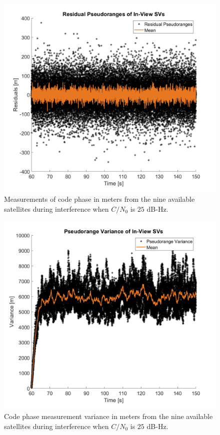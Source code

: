 \documentclass[12pt]{report}
\begin{document}
\begin{figure}[!ht]
  \centering
  \includegraphics[width=0.75\linewidth]{Figures/Results/Scenario1/Case25/codephase.png}
  \caption{Measurements of code phase in meters from the nine available satellites during interference when \(C/N_0\) is \(25\) dB-Hz.}\label{fig:codephase25}
\end{figure}

\begin{figure}[!ht]
  \centering
  \includegraphics[width=0.75\linewidth]{Figures/Results/Scenario1/Case25/codeVariance.png}
  \caption{Code phase measurement variance in meters from the nine available satellites during interference when \(C/N_0\) is \(25\) dB-Hz.}\label{fig:codephaseVariance25}
\end{figure}
\end{document}
